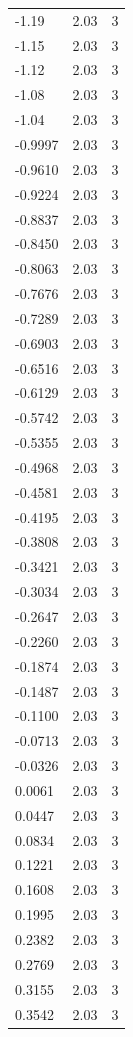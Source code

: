 \begin{longtable}{lrr}
  -1.19 & 2.03 & 3 \\
  -1.15 & 2.03 & 3 \\
  -1.12 & 2.03 & 3 \\
  -1.08 & 2.03 & 3 \\
  -1.04 & 2.03 & 3 \\
  -0.9997 & 2.03 & 3 \\
  -0.9610 & 2.03 & 3 \\
  -0.9224 & 2.03 & 3 \\
  -0.8837 & 2.03 & 3 \\
  -0.8450 & 2.03 & 3 \\
  -0.8063 & 2.03 & 3 \\
  -0.7676 & 2.03 & 3 \\
  -0.7289 & 2.03 & 3 \\
  -0.6903 & 2.03 & 3 \\
  -0.6516 & 2.03 & 3 \\
  -0.6129 & 2.03 & 3 \\
  -0.5742 & 2.03 & 3 \\
  -0.5355 & 2.03 & 3 \\
  -0.4968 & 2.03 & 3 \\
  -0.4581 & 2.03 & 3 \\
  -0.4195 & 2.03 & 3 \\
  -0.3808 & 2.03 & 3 \\
  -0.3421 & 2.03 & 3 \\
  -0.3034 & 2.03 & 3 \\
  -0.2647 & 2.03 & 3 \\
  -0.2260 & 2.03 & 3 \\
  -0.1874 & 2.03 & 3 \\
  -0.1487 & 2.03 & 3 \\
  -0.1100 & 2.03 & 3 \\
  -0.0713 & 2.03 & 3 \\
  -0.0326 & 2.03 & 3 \\
  0.0061 & 2.03 & 3 \\
  0.0447 & 2.03 & 3 \\
  0.0834 & 2.03 & 3 \\
  0.1221 & 2.03 & 3 \\
  0.1608 & 2.03 & 3 \\
  0.1995 & 2.03 & 3 \\
  0.2382 & 2.03 & 3 \\
  0.2769 & 2.03 & 3 \\
  0.3155 & 2.03 & 3 \\
  0.3542 & 2.03 & 3 \\

\end{longtable}
